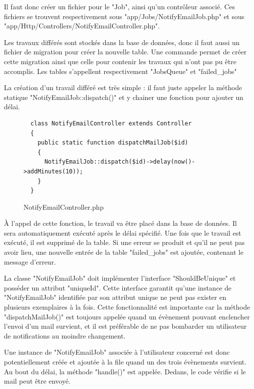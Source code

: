 \documentclass[
    iai, %
    eai, %
]{heig-tb}
\begin{document}
Il faut donc créer un fichier pour le "Job", ainsi qu'un contrôleur associé. Ces fichiers se trouvent respectivement sous "app/Jobs/NotifyEmailJob.php" et sous "app/Http/Controllers/NotifyEmailController.php".

Les travaux différés sont stockés dans la base de données, donc il faut aussi un fichier de migration pour créer la nouvelle table.
Une commande permet de créer cette migration ainsi que celle pour contenir les travaux qui n'ont pas pu être accomplis. Les tables s'appellent respectivement "JobsQueue" et "failed\_jobs"

La création d'un travail différé est très simple : il faut juste appeler la méthode statique "NotifyEmailJob::dispatch()" et y chainer une fonction pour ajouter un délai.

\begin{figure}[h]
  \begin{verbatim}
  class NotifyEmailController extends Controller
  {
    public static function dispatchMailJob($id)
    {
      NotifyEmailJob::dispatch($id)->delay(now()->addMinutes(10));
    }
  }
  \end{verbatim}
  \caption{NotifyEmailController.php}
\end{figure}

À l'appel de cette fonction, le travail va être placé dans la base de données. Il sera automatiquement exécuté après le délai spécifié. Une fois que le travail est exécuté, il est supprimé de la table. Si une erreur se produit et qu'il ne peut pas avoir lieu, une nouvelle entrée de la table "failed\_jobs" est ajoutée, contenant le message d'erreur.

La classe "NotifyEmailJob" doit implémenter l'interface "ShouldBeUnique" et posséder un attribut "uniqueId". Cette interface garantit qu'une instance de "NotifyEmailJob" identifiée par son attribut unique ne peut pas exister en plusieurs exemplaires à la fois.
Cette fonctionnalité est importante car la méthode "dispatchMailJob()" est toujours appelée quand un évènement pouvant enclencher l'envoi d'un mail survient, et il est préférable de ne pas bombarder un utilisateur de notifications au moindre changement.

\newpage
Une instance de "NotifyEmailJob" associée à l'utilisateur concerné est donc potentiellement créée et ajoutée à la file quand un des trois évènements survient. Au bout du délai, la méthode "handle()" est appelée. Dedans, le code vérifie si le mail peut être envoyé.
\end{document}
